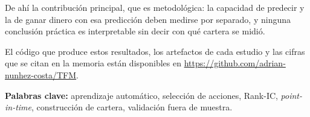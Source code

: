 De ahí la contribución principal, que es metodológica: la capacidad de predecir y la de ganar dinero
con esa predicción deben medirse por separado, y ninguna conclusión práctica es interpretable sin
decir con qué cartera se midió.

El código que produce estos resultados, los artefactos de cada estudio y las cifras que se citan
en la memoria están disponibles en \url{https://github.com/adrian-nunhez-costa/TFM}.

\noindent\textbf{Palabras clave:} aprendizaje automático, selección de acciones, Rank-IC,
\textit{point-in-time}, construcción de cartera, validación fuera de muestra.
